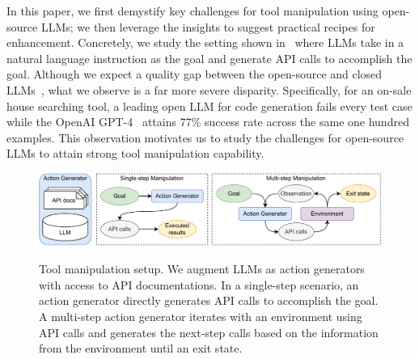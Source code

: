 In this paper, we first demystify key challenges for tool manipulation using open-source LLMs; we then leverage the insights to suggest practical recipes for enhancement. 
Concretely, we study the setting shown in~ where LLMs take in a natural language instruction as the goal and generate API calls to accomplish the goal. 
Although we expect a quality gap between the open-source and closed LLMs~\cite{liang2022holistic}, what we observe is a far more severe disparity. Specifically, for an on-sale house searching tool, a leading open LLM for code generation fails every test case while the OpenAI GPT-4~\cite{OpenAI2023-ov} attains $77\%$ success rate across the same one hundred examples. 
This observation motivates us to study the challenges for open-source LLMs to attain strong tool manipulation capability.

\begin{figure}[t!]
\caption{Tool manipulation setup. 
We augment LLMs as action generators with access to API documentations. 
In a single-step scenario, an action generator directly generates API calls to accomplish the goal. A multi-step action generator iterates with an environment using API calls and generates the next-step calls based on the information from the environment until an exit state.
}
\centering
\includegraphics[width=\textwidth]{plots/task.pdf}
\label{fig:task_setup}
\vspace{-1em}
\end{figure}

